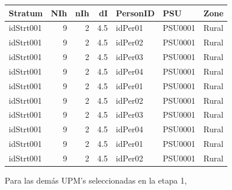 \documentclass[
  12pt,
]{book}
\newenvironment{Shaded}{\begin{snugshade}}{\end{snugshade}}
\newcommand{\AttributeTok}[1]{\textcolor[rgb]{0.77,0.63,0.00}{#1}}
\newcommand{\ControlFlowTok}[1]{\textcolor[rgb]{0.13,0.29,0.53}{\textbf{#1}}}
\newcommand{\DecValTok}[1]{\textcolor[rgb]{0.00,0.00,0.81}{#1}}
\newcommand{\FunctionTok}[1]{\textcolor[rgb]{0.00,0.00,0.00}{#1}}
\newcommand{\NormalTok}[1]{#1}
\newcommand{\OtherTok}[1]{\textcolor[rgb]{0.56,0.35,0.01}{#1}}
\newcommand{\SpecialCharTok}[1]{\textcolor[rgb]{0.00,0.00,0.00}{#1}}
\newcommand{\StringTok}[1]{\textcolor[rgb]{0.31,0.60,0.02}{#1}}
\begin{document}
\begin{tabular}{l|r|r|r|l|l|l}
\hline
Stratum & NIh & nIh & dI & PersonID & PSU & Zone\\
\hline
idStrt001 & 9 & 2 & 4.5 & idPer01 & PSU0001 & Rural\\
\hline
idStrt001 & 9 & 2 & 4.5 & idPer02 & PSU0001 & Rural\\
\hline
idStrt001 & 9 & 2 & 4.5 & idPer03 & PSU0001 & Rural\\
\hline
idStrt001 & 9 & 2 & 4.5 & idPer04 & PSU0001 & Rural\\
\hline
idStrt001 & 9 & 2 & 4.5 & idPer01 & PSU0001 & Rural\\
\hline
idStrt001 & 9 & 2 & 4.5 & idPer02 & PSU0001 & Rural\\
\hline
idStrt001 & 9 & 2 & 4.5 & idPer03 & PSU0001 & Rural\\
\hline
idStrt001 & 9 & 2 & 4.5 & idPer04 & PSU0001 & Rural\\
\hline
idStrt001 & 9 & 2 & 4.5 & idPer01 & PSU0001 & Rural\\
\hline
idStrt001 & 9 & 2 & 4.5 & idPer02 & PSU0001 & Rural\\
\hline
\end{tabular}

Para las demás UPM's seleccionadas en la etapa 1,

\begin{Shaded}
\end{Shaded}
\end{document}
